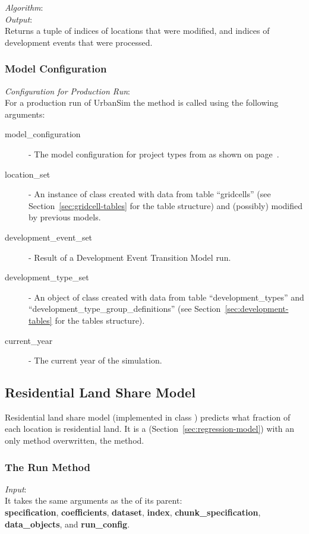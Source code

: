 {\it Algorithm}:\\[1mm]


{\it Output}:~\\[1mm]
Returns a tuple of indices of locations that were modified, and indices of
development events that were processed.

\subsubsection{Model Configuration}
\modelsindex
%
{\em Configuration for Production Run}:\\[1mm]
For a production run of UrbanSim the method  is called using the
following arguments:
\begin{description}
\item[model_configuration] - The model configuration for project types from
   as shown on page~\pageref{page:model-configuration}.
\item[location_set] - An instance of class  created with
  data from table ``gridcells'' (see Section~\ref{sec:gridcell-tables} for the
  table structure) and (possibly) modified by previous models. 
\item[development_event_set] - Result of a Development Event Transition Model 
  run.
\item[development_type_set] - An object of class 
  created with data from table ``development_types'' and
  ``development_type_group_definitions'' (see
  Section~\ref{sec:development-tables} for the tables structure).
\item[current_year] - The current year of the simulation.
\end{description}

%
\subsection{Residential Land Share Model}
\modelsindex
%
\label{sec:residential-land-share-model}

Residential land share model (implemented in class
) predicts what fraction of each location is
residential land. It is a  
(Section~\ref{sec:regression-model}) with an only method overwritten, the
 method.

\subsubsection{The Run Method}
%
{\it Input}:\\[1mm]
It takes the same arguments as the  of its parent: \\
{\bf specification}, {\bf coefficients}, {\bf dataset}, {\bf index}, {\bf
  chunk_specification}, {\bf data_objects}, and {\bf run_config}.

